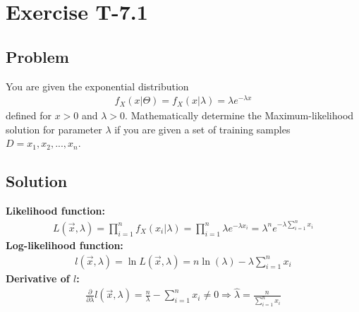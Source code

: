 \section*{Exercise T-7.1}

\subsection*{Problem}
You are given the exponential distribution\\
\begin{align}
f_X (x|\Theta) = f_X (x|\lambda) = \lambda e^{- \lambda x} \nonumber
\end{align}
defined for $x > 0$ and $\lambda > 0$. Mathematically determine the Maximum-likelihood solution for parameter $\lambda$ if you are given a set of training samples $D = x_1 , x_2 , ..., x_n $.

\subsection*{Solution}
\textbf{Likelihood function:}
\begin{align}
L(\overrightarrow{x},\lambda) = \prod_{i=1}^{n}f_X(x_i | \lambda)=\prod_{i=1}^{n}\lambda e^{-\lambda x_i}=\lambda^n e^{-\lambda \sum_{i=1}^{n} x_i}\nonumber
\end{align}
\textbf{Log-likelihood function:}
\begin{align}
l(\overrightarrow{x},\lambda)=\ln L(\overrightarrow{x},\lambda) = n \ln(\lambda)-\lambda \sum_{i=1}^{n}x_i\nonumber
\end{align}
\textbf{Derivative of $l$:}
\begin{align}
\frac{\partial}{\partial\lambda}l(\overrightarrow{x},\lambda)=\frac{n}{\lambda}-\sum_{i=1}^{n}x_i\ne 0 \Longrightarrow \hat{\lambda}=\frac{n}{\sum_{i=1}^{n}x_i} \nonumber
\end{align}